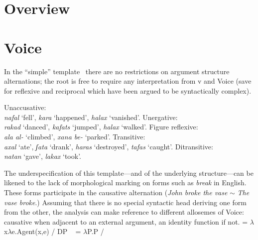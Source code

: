 \section{Overview}



\section{Voice}

In the ``simple'' template \tkal~there are no restrictions on argument structure alternations; the root is free to require any interpretation from v and Voice (save for reflexive and reciprocal which have been argued to be syntactically complex).\\
    \begin{minipage}[t]{0.5\textwidth}
    \pex
        \a Unaccusative:\\ \emph{nafal} `fell', \emph{kara} `happened', \emph{halax} `vanished'.
        \a Unergative:\\ \emph{rakad} `danced', \emph{kafats} `jumped', \emph{halax} `walked'.
        \a Figure reflexive:\\ \emph{ala al-} `climbed', \emph{xana be-} `parked'.
        \a Transitive:\\ \emph{axal} `ate', \emph{ʃata} `drank', \emph{haras} `destroyed', \emph{tafas} `caught'.
        \a Ditransitive:\\ \emph{natan} `gave', \emph{lakax} `took'.
    \xe
\end{minipage}
\begin{minipage}[t]{0.05\textwidth}
    \phantom{asdfasdf}
\end{minipage}
\begin{minipage}[t]{0.4\textwidth}
    \ex
    \xe
\end{minipage}

The underspecification of this template---and of the underlying structure---can be likened to the lack of morphological marking on forms such as \emph{break} in English. These forms participate in the causative alternation (\emph{John broke the vase} $\sim$ \emph{The vase broke}.) Assuming that there is no special syntactic head deriving one form from the other, the analysis can make reference to different allosemes of Voice: causative when adjacent to an external argument, an identity function if not.
\pex
	\a {} = $\lambda$x$\lambda$e.Agent(x,e) / DP \trace~
	\a {} = $\lambda$P.P / \trace~
\xe

